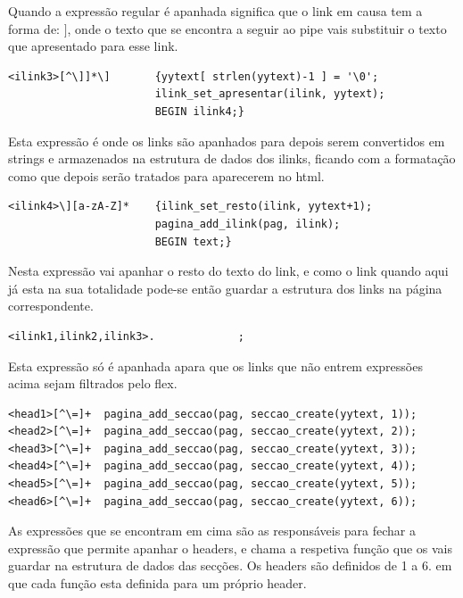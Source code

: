 \documentclass[11pt, a4paper, oneside]{article}
\begin{document}
Quando a expressão regular é apanhada significa que o link em causa tem a forma de: \begin{math}[[Opacity, texto a apanhar| texto]] \end{math}, onde o texto que se encontra a seguir ao pipe vais substituir o texto que apresentado para esse link.

\begin{verbatim}
<ilink3>[^\]]*\]       {yytext[ strlen(yytext)-1 ] = '\0';
                       ilink_set_apresentar(ilink, yytext);
                       BEGIN ilink4;}
\end{verbatim}


Esta expressão é onde os links são apanhados para depois serem convertidos em strings e armazenados na estrutura de dados dos ilinks, ficando com a formatação como que depois serão tratados para aparecerem no html.

\begin{verbatim}
<ilink4>\][a-zA-Z]*    {ilink_set_resto(ilink, yytext+1);
                       pagina_add_ilink(pag, ilink);
                       BEGIN text;}
\end{verbatim}

Nesta expressão vai apanhar o resto do texto do link, e como o link quando aqui já esta na sua totalidade pode-se então guardar a estrutura dos links na página correspondente.


\begin{verbatim}
<ilink1,ilink2,ilink3>.             ;
\end{verbatim}


Esta expressão só é apanhada apara que os links que não entrem expressões acima sejam filtrados pelo flex. 



\begin{verbatim}
<head1>[^\=]+  pagina_add_seccao(pag, seccao_create(yytext, 1));
<head2>[^\=]+  pagina_add_seccao(pag, seccao_create(yytext, 2));
<head3>[^\=]+  pagina_add_seccao(pag, seccao_create(yytext, 3));
<head4>[^\=]+  pagina_add_seccao(pag, seccao_create(yytext, 4));
<head5>[^\=]+  pagina_add_seccao(pag, seccao_create(yytext, 5));
<head6>[^\=]+  pagina_add_seccao(pag, seccao_create(yytext, 6));
\end{verbatim}
As expressões que se encontram em cima são as responsáveis para fechar a expressão que permite apanhar o headers, e chama a respetiva função que os vais guardar na estrutura de dados das secções. Os headers são definidos de 1 a 6. em que cada função esta definida para um próprio header. 
\end{document}
